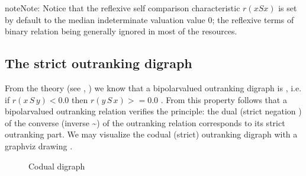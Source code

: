 \documentclass[a4paper,12pt,english]{sphinxhowto}
\let\sphinxpxdimen\pdfpxdimen\else\newdimen\sphinxpxdimen
\begin{document}
\begin{sphinxadmonition}{note}{Note:}
Notice that the reflexive self comparison characteristic \(r(x S x)\) is set by default to the median indeterminate valuation value 0; the reflexive terms of binary relation being generally ignored in most of the  resources.
\end{sphinxadmonition}


\subsection{The strict outranking digraph}
\label{\detokenize{tutorial:the-strict-outranking-digraph}}\label{\detokenize{tutorial:codual-digraph-label}}
From the theory (see ,  )  we know that a bipolar\sphinxhyphen{}valued outranking digraph is , i.e. if \(r(x\,S\,y) < 0.0\) then \(r(y\,S\,x) >= 0.0\) . From this property follows that a bipolar\sphinxhyphen{}valued outranking relation verifies the  principle: the dual (strict negation \sphinxhyphen{} \sphinxfootnotemark[14]) of the converse (inverse \textasciitilde{}) of the outranking relation corresponds to its strict outranking part. We may visualize the codual (strict) outranking digraph with a graphviz drawing \sphinxfootnotemark[1].

\begin{sphinxVerbatim}[commandchars=\\\{\},numbers=left,firstnumber=1,stepnumber=1]
  
\end{sphinxVerbatim}

\begin{figure}[H]
\centering
\capstart

\noindent\sphinxincludegraphics[width=300\sphinxpxdimen]{{codualOdg}.png}
\caption{Codual digraph}\label{\detokenize{tutorial:id117}}\end{figure}
\end{document}
